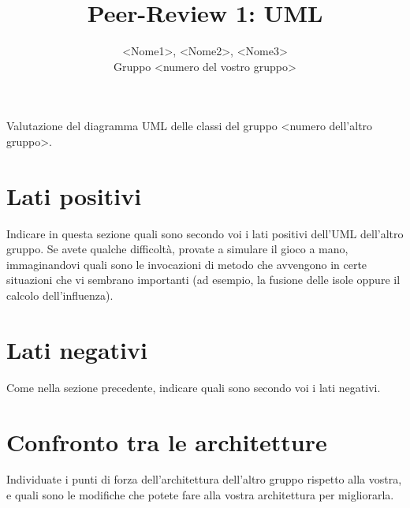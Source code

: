 \documentclass[12pt]{article}
\title{Peer-Review 1: UML}
\author{<Nome1>, <Nome2>, <Nome3>\\Gruppo <numero del vostro gruppo>}
\begin{document}
\maketitle

Valutazione del diagramma UML delle classi del gruppo <numero dell’altro gruppo>.

\section{Lati positivi}

Indicare in questa sezione quali sono secondo voi i lati positivi dell’UML dell’altro gruppo. Se avete qualche difficoltà, provate a simulare il gioco a mano, immaginandovi quali sono le invocazioni di metodo che avvengono in certe situazioni che vi sembrano importanti (ad esempio, la fusione delle isole oppure il calcolo dell’influenza).

\section{Lati negativi}

Come nella sezione precedente, indicare quali sono secondo voi i lati negativi.

\section{Confronto tra le architetture}

Individuate i punti di forza dell’architettura dell’altro gruppo rispetto alla vostra, e quali sono le modifiche che potete fare alla vostra architettura per migliorarla.
\end{document}

